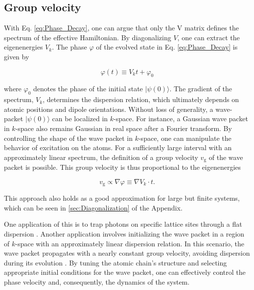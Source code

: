 \subsection{Group velocity} \label{subsec:Phase_vel_Control}

\noindent
With Eq. \eqref{eq:Phase_Decay}, one can argue that only the V matrix defines the spectrum of the effective Hamiltonian.
By diagonalizing \(V\), one can extract the eigenenergies \(V_k\).
The phase \( \varphi \) of the evolved state in Eq. \eqref{eq:Phase_Decay} is given by

\begin{equation}
\varphi(t) \equiv V_k t + \varphi_0
\end{equation}

\noindent
where $\varphi_0$ denotes the phase of the initial state $\vert  \psi(0) \rangle$.
The gradient of the spectrum, \(V_k\), determines the dispersion relation,
which ultimately depends on atomic positions and dipole orientations.
Without loss of generality, a wave-packet $ \vert  \psi(0) \rangle $ can be localized in $k$-space.
For instance, a Gaussian wave packet in $k$-space also remains Gaussian in real space after a Fourier transform.
By controlling the shape of the wave packet in \(k\)-space, one can manipulate the behavior of excitation on the atoms.
For a sufficiently large interval with an approximately linear spectrum,
the definition of a group velocity $ v_\text{g} $ of the wave packet is possible.
This group velocity is thus proportional to the eigenenergies

\begin{equation}
    v_\text{g} \propto \nabla \varphi \equiv \nabla V_k \cdot t.
\end{equation}

\noindent
This approach also holds as a good approximation for large but finite systems,
which can be seen in \autoref{sec:Diagonalization} of the Appendix.

\noindent
One application of this is to trap photons on specific lattice sites through a flat dispersion \cite{Cech2023}.
Another application involves initializing the wave packet in a region of \(k\)-space with an approximately linear dispersion relation.
In this scenario, the wave packet propagates with a nearly constant group velocity, avoiding dispersion during its evolution \cite{Needham2019}.
By tuning the atomic chain's structure and selecting appropriate initial conditions for the wave packet, one can effectively control the phase velocity and, consequently, the dynamics of the system.